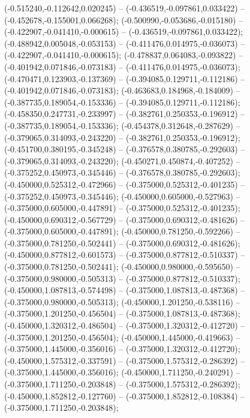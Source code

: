 (-0.515240,-0.112642,0.020245) -- (-0.436519,-0.097861,0.033422) -- (-0.452678,-0.155001,0.066268);
 (-0.500990,-0.053686,-0.015180) -- (-0.422907,-0.041410,-0.000615) -- (-0.436519,-0.097861,0.033422);
 (-0.488942,0.005048,-0.053153) -- (-0.411476,0.014975,-0.036073) -- (-0.422907,-0.041410,-0.000615);
 (-0.478837,0.064083,-0.093822) -- (-0.401942,0.071846,-0.073183) -- (-0.411476,0.014975,-0.036073);
 (-0.470471,0.123903,-0.137369) -- (-0.394085,0.129711,-0.112186) -- (-0.401942,0.071846,-0.073183);
 (-0.463683,0.184968,-0.184009) -- (-0.387735,0.189054,-0.153336) -- (-0.394085,0.129711,-0.112186);
 (-0.458350,0.247731,-0.233997) -- (-0.382761,0.250353,-0.196912) -- (-0.387735,0.189054,-0.153336);
 (-0.454378,0.312648,-0.287629) -- (-0.379065,0.314093,-0.243220) -- (-0.382761,0.250353,-0.196912);
 (-0.451700,0.380195,-0.345248) -- (-0.376578,0.380785,-0.292603) -- (-0.379065,0.314093,-0.243220);
 (-0.450271,0.450874,-0.407252) -- (-0.375252,0.450973,-0.345446) -- (-0.376578,0.380785,-0.292603);
 (-0.450000,0.525312,-0.472966) -- (-0.375000,0.525312,-0.401235) -- (-0.375252,0.450973,-0.345446);
 (-0.450000,0.605000,-0.527963) -- (-0.375000,0.605000,-0.447891) -- (-0.375000,0.525312,-0.401235);
 (-0.450000,0.690312,-0.567729) -- (-0.375000,0.690312,-0.481626) -- (-0.375000,0.605000,-0.447891);
 (-0.450000,0.781250,-0.592266) -- (-0.375000,0.781250,-0.502441) -- (-0.375000,0.690312,-0.481626);
 (-0.450000,0.877812,-0.601573) -- (-0.375000,0.877812,-0.510337) -- (-0.375000,0.781250,-0.502441);
 (-0.450000,0.980000,-0.595650) -- (-0.375000,0.980000,-0.505313) -- (-0.375000,0.877812,-0.510337);
 (-0.450000,1.087813,-0.574498) -- (-0.375000,1.087813,-0.487368) -- (-0.375000,0.980000,-0.505313);
 (-0.450000,1.201250,-0.538116) -- (-0.375000,1.201250,-0.456504) -- (-0.375000,1.087813,-0.487368);
 (-0.450000,1.320312,-0.486504) -- (-0.375000,1.320312,-0.412720) -- (-0.375000,1.201250,-0.456504);
 (-0.450000,1.445000,-0.419663) -- (-0.375000,1.445000,-0.356016) -- (-0.375000,1.320312,-0.412720);
 (-0.450000,1.575312,-0.337591) -- (-0.375000,1.575312,-0.286392) -- (-0.375000,1.445000,-0.356016);
 (-0.450000,1.711250,-0.240291) -- (-0.375000,1.711250,-0.203848) -- (-0.375000,1.575312,-0.286392);
 (-0.450000,1.852812,-0.127760) -- (-0.375000,1.852812,-0.108384) -- (-0.375000,1.711250,-0.203848);
